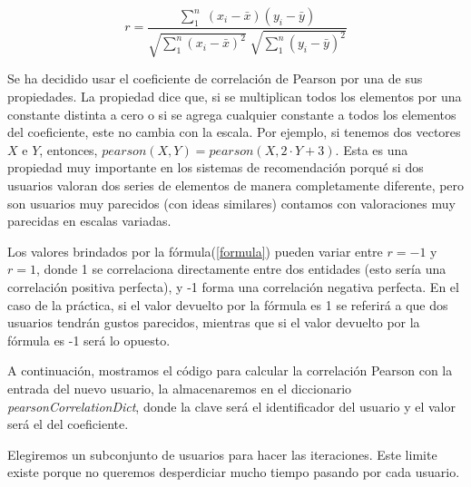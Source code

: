 \documentclass{uimppracticas}
\begin{document}
\begin{equation}\label{formula}
	r = \frac{\sum_{1}^{n} \; (x_{i} - \bar{x}) (y_{i} - \bar{y})}{\sqrt{\sum_{1}^{n}(x_{i} - \bar{x})^2} \; \sqrt{\sum_{1}^{n}(y_{i} - \bar{y})^2}}
\end{equation}

Se ha decidido usar el coeficiente de correlación de Pearson por una de sus propiedades. La propiedad dice que, si se multiplican todos los elementos por una constante distinta a cero o si se agrega cualquier constante a todos los elementos del coeficiente, este no cambia con la escala. Por ejemplo, si tenemos dos vectores $X$ e $Y$, entonces, $pearson(X,Y) = pearson(X,2\cdot Y+3)$. Esta es una propiedad muy importante en los sistemas de recomendación porqué si dos usuarios valoran dos series de elementos de manera completamente diferente, pero son usuarios muy parecidos (con ideas similares) contamos con valoraciones muy parecidas en escalas variadas.

Los valores brindados por la fórmula(\ref{formula}) pueden variar entre $r=-1$ y $r=1$, donde 1 se correlaciona directamente entre dos entidades (esto sería una correlación positiva perfecta), y -1 forma una correlación negativa perfecta. En el caso de la práctica, si el valor devuelto por la fórmula es 1 se referirá a que dos usuarios tendrán gustos parecidos, mientras que si el valor devuelto por la fórmula es -1 será lo opuesto.

A continuación, mostramos el código para calcular la correlación Pearson con la entrada del nuevo usuario, la almacenaremos en el diccionario \textit{pearsonCorrelationDict}, donde la clave será el identificador del usuario y el valor será el del coeficiente.

Elegiremos un subconjunto de usuarios para hacer las iteraciones. Este limite existe porque no queremos desperdiciar mucho tiempo pasando por cada usuario.
\end{document}
